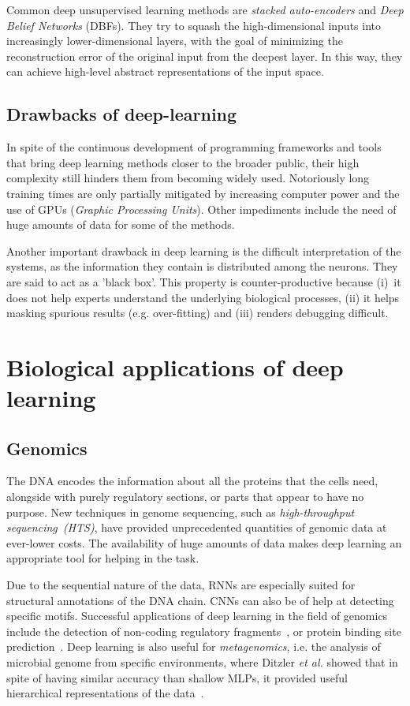 \documentclass[journal]{IEEEtran}
\begin{document}
Common deep unsupervised learning methods are \textit{stacked auto-encoders} and \textit{Deep Belief Networks} (DBFs). They try to squash the high-dimensional inputs into increasingly lower-dimensional layers, with the goal of minimizing the reconstruction error of the original input from the deepest layer. In this way, they can achieve high-level abstract representations of the input space.

\subsection{Drawbacks of deep-learning}

In spite of the continuous development of programming frameworks and tools that bring deep learning methods closer to the broader public, their high complexity still hinders them from becoming widely used. Notoriously long training times are only partially mitigated by increasing computer power and the use of GPUs (\textit{Graphic Processing Units}). Other impediments include the need of huge amounts of data for some of the methods.

Another important drawback in deep learning is the difficult interpretation of the systems, as the information they contain is distributed among the neurons. They are said to act as a 'black box'. This property is counter-productive because (i)~it does not help experts understand the underlying biological processes, (ii) it helps masking spurious results (e.g. over-fitting) and (iii) renders debugging difficult.


\section{Biological applications of deep learning}
\label{bio-apps}

\subsection{Genomics}
The DNA encodes the information about all the proteins that the cells need, alongside with purely regulatory sections, or parts that appear to have no purpose. New techniques in genome sequencing, such as \textit{high-throughput sequencing~(HTS)}, have provided unprecedented quantities of genomic data at ever-lower costs. The availability of huge amounts of data makes deep learning an appropriate tool for helping in the task.

Due to the sequential nature of the data, RNNs are especially suited for structural annotations of the DNA chain. CNNs can also be of help at detecting specific motifs. Successful applications of deep learning in the field of genomics include the detection of non-coding regulatory fragments~\cite{Zhou2015}, or protein binding site prediction~\cite{Alipanahi2015}. Deep learning is also useful for \textit{metagenomics}, i.e. the analysis of microbial genome from specific environments, where Ditzler \textit{et al.} showed that in spite of having similar accuracy than shallow MLPs, it provided useful hierarchical representations of the data~\cite{Ditzler2015}.
\end{document}
